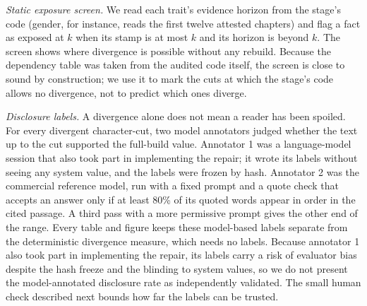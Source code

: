 \documentclass[sn-mathphys]{sn-jnl}%
\theoremstyle{thmstyleone}%
\theoremstyle{thmstyletwo}%
\theoremstyle{thmstylethree}%
\begin{document}
\emph{Static exposure screen.} We read each trait's evidence horizon from the stage's code (gender, for instance, reads the first twelve attested chapters) and flag a fact as exposed at $k$ when its stamp is at most $k$ and its horizon is beyond $k$. The screen shows where divergence is possible without any rebuild. Because the dependency table was taken from the audited code itself, the screen is close to sound by construction; we use it to mark the cuts at which the stage's code allows no divergence, not to predict which ones diverge.

\emph{Disclosure labels.} A divergence alone does not mean a reader has been spoiled. For every divergent character-cut, two model annotators judged whether the text up to the cut supported the full-build value. Annotator 1 was a language-model session that also took part in implementing the repair; it wrote its labels without seeing any system value, and the labels were frozen by hash. Annotator 2 was the commercial reference model, run with a fixed prompt and a quote check that accepts an answer only if at least 80\% of its quoted words appear in order in the cited passage. A third pass with a more permissive prompt gives the other end of the range. Every table and figure keeps these model-based labels separate from the deterministic divergence measure, which needs no labels. Because annotator 1 also took part in implementing the repair, its labels carry a risk of evaluator bias despite the hash freeze and the blinding to system values, so we do not present the model-annotated disclosure rate as independently validated. The small human check described next bounds how far the labels can be trusted.
\end{document}
